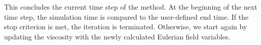 This concludes the current time step of the \MP method. At the beginning of the next time step, the simulation time is compared to the user-defined end time. If the stop criterion is met, the iteration is terminated. Otherwise, we start again by updating the viscosity with the newly calculated Eulerian field variables.






